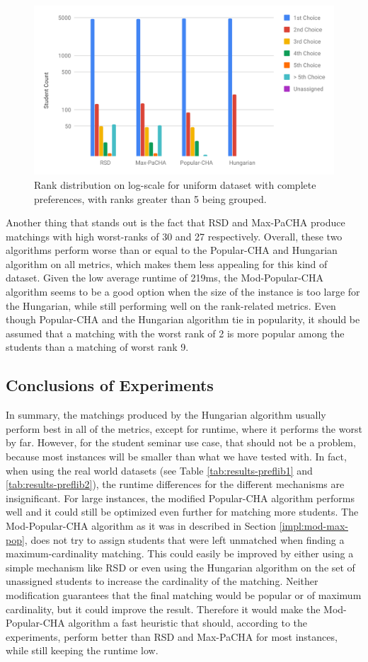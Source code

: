 \begin{figure}[h!]
  \centering
    \includegraphics[width=0.75\linewidth]{assets/plots/uniform_compl_distr.pdf}
    \caption{Rank distribution on log-scale for uniform dataset with complete preferences, with ranks greater than 5 being grouped.}
    \label{fig:uniform-complete-distribution}
\end{figure}

Another thing that stands out is the fact that RSD and Max-PaCHA produce matchings with high worst-ranks of 30 and 27 respectively. Overall, these two algorithms perform worse than or equal to the Popular-CHA and Hungarian algorithm on all metrics, which makes them less appealing for this kind of dataset. Given the low average runtime of 219ms, the Mod-Popular-CHA algorithm seems to be a good option when the size of the instance is too large for the Hungarian, while still performing well on the rank-related metrics. Even though Popular-CHA and the Hungarian algorithm tie in popularity, it should be assumed that a matching with the worst rank of 2 is more popular among the students than a matching of worst rank 9. 

\subsection{Conclusions of Experiments}
In summary, the matchings produced by the Hungarian algorithm usually perform best in all of the metrics, except for runtime, where it performs the worst by far. However, for the student seminar use case, that should not be a problem, because most instances will be smaller than what we have tested with. In fact, when using the real world datasets (see Table \ref{tab:results-preflib1} and \ref{tab:results-preflib2}), the runtime differences for the different mechanisms are insignificant. For large instances, the modified Popular-CHA algorithm performs well and it could still be optimized even further for matching more students. The Mod-Popular-CHA algorithm as it was in described in Section \ref{impl:mod-max-pop}, does not try to assign students that were left unmatched when finding a maximum-cardinality matching. This could easily be improved by either using a simple mechanism like RSD or even using the Hungarian algorithm on the set of unassigned students to increase the cardinality of the matching. Neither modification guarantees that the final matching would be popular or of maximum cardinality, but it could improve the result. Therefore it would make the Mod-Popular-CHA algorithm a fast heuristic that should, according to the experiments, perform better than RSD and Max-PaCHA for most instances, while still keeping the runtime low.

